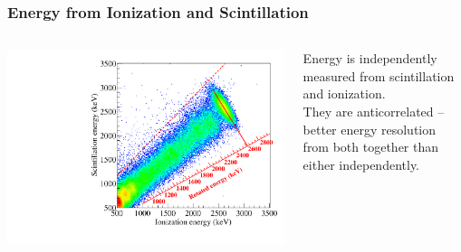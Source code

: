 \documentclass{beamer}
\begin{document}
\begin{frame}
\begin{center}
\frametitle{Energy from Ionization and Scintillation}
\end{center}
\begin{columns}
\begin{column}{.75\textwidth}
\includegraphics[keepaspectratio=true,width=\textwidth]{RotationTh2D_withCalibration.pdf}
\end{column}
\begin{column}{.25\textwidth}
Energy is independently measured from scintillation and ionization.\\[\baselineskip]

They are anticorrelated -- better energy resolution from both together than either independently.
\end{column}
\end{columns}
\end{frame}
\end{document}
